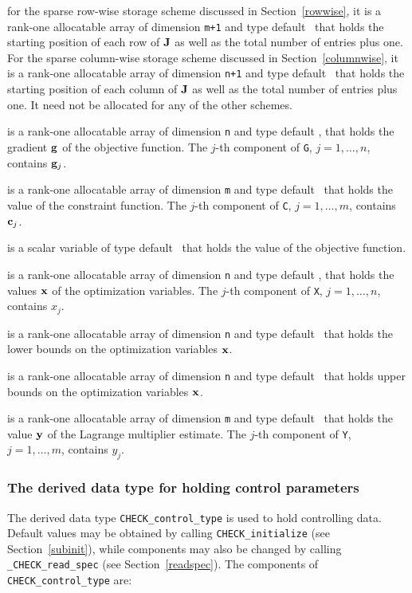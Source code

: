 \documentclass{galahad}
\newcommand{\packagename}{CHECK}
\newcommand{\fullpackagename}{\libraryname\_\packagename}
\begin{document}
\begin{description}
\begin{description}
 for the sparse row-wise storage
scheme discussed in Section~\ref{rowwise}, it is a rank-one allocatable array of dimension {\tt m+1} and type 
default \integer\ that holds the starting position of 
each row of ${\mathbf{J}}$ as well
as the total number of entries plus one. For the sparse column-wise storage
scheme discussed in Section~\ref{columnwise}, it is a rank-one allocatable array of dimension {\tt n+1} and type 
default \integer\ that holds the starting position of 
each column of ${\mathbf{J}}$ as well
as the total number of entries plus one. It need not be
allocated for any of the other schemes.

\end{description}

 is a rank-one allocatable array of dimension {\tt n} and type 
default \realdp, that holds the gradient ${\mathbf{g}}$ 
of the objective function.
The $j$-th component of 
{\tt G}, $j = 1,  \ldots ,  n$, contains ${\mathbf{g}}_{j}$.

 is a rank-one allocatable array of dimension {\tt m} and type 
default \realdp\ that holds the value of the constraint function.
The $j$-th component of {\tt C}, $j = 1, \ldots , m$, contains ${\mathbf{c}}_{j}$.

 is a scalar variable of type 
default \realdp\ that holds the value of the objective function.

 is a rank-one allocatable array of dimension {\tt n} and type 
default \realdp, 
that holds the values ${\mathbf{x}}$ of the optimization variables.
The $j$-th component of {\tt X}, $j = 1,  \ldots , n$, contains
$x_{j}$.

 is a rank-one allocatable array of dimension {\tt n} and type 
default \realdp\ 
that holds the lower bounds on the optimization variables ${\mathbf{x}}$.

 is a rank-one allocatable array of dimension {\tt n} and type 
default \realdp\ 
that holds upper  bounds on the optimization variables ${\mathbf{x}}$.

 is a rank-one allocatable array of dimension {\tt m} and type 
default \realdp\ 
that holds the value ${\mathbf{y}}$ of the Lagrange multiplier estimate.
The $j$-th component of {\tt Y}, $j = 1,  \ldots , m$, contains
$y_{j}$.  

\end{description}


\subsubsection{The derived data type for holding control 
 parameters}\label{typecontrol}
The derived data type 
{\tt \packagename\_control\_type} 
is used to hold controlling data. Default values may be obtained by calling 
{\tt \packagename\_initialize}
(see Section~\ref{subinit}),
while components may also be changed by calling 
{\tt \fullpackagename\_read\-\_spec}
(see Section~\ref{readspec}). 
The components of 
{\tt \packagename\_control\_type} 
are:
\end{document}
